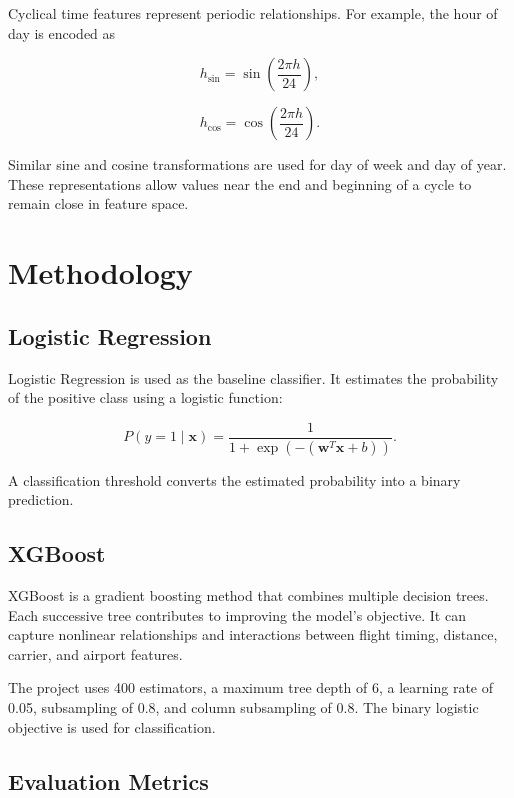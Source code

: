 \documentclass[conference]{IEEEtran}
\begin{document}
Cyclical time features represent periodic relationships. For example,
the hour of day is encoded as

\begin{equation}
h_{\sin} = \sin\left(\frac{2\pi h}{24}\right),
\end{equation}

\begin{equation}
h_{\cos} = \cos\left(\frac{2\pi h}{24}\right).
\end{equation}

Similar sine and cosine transformations are used for day of week
and day of year. These representations allow values near the end
and beginning of a cycle to remain close in feature space.

\section{Methodology}

\subsection{Logistic Regression}

Logistic Regression is used as the baseline classifier. It estimates
the probability of the positive class using a logistic function:

\begin{equation}
P(y=1 \mid \mathbf{x}) =
\frac{1}{1+\exp(-(\mathbf{w}^{T}\mathbf{x}+b))}.
\end{equation}

A classification threshold converts the estimated probability into
a binary prediction.

\subsection{XGBoost}

XGBoost is a gradient boosting method that combines multiple decision
trees. Each successive tree contributes to improving the model's
objective. It can capture nonlinear relationships and interactions
between flight timing, distance, carrier, and airport features.

The project uses 400 estimators, a maximum tree depth of 6, a learning
rate of 0.05, subsampling of 0.8, and column subsampling of 0.8.
The binary logistic objective is used for classification.

\subsection{Evaluation Metrics}
\end{document}
